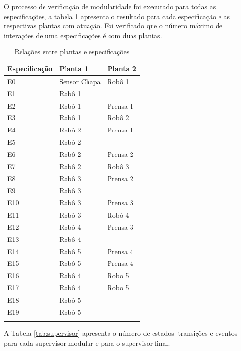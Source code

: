 O processo de verificação de modularidade foi executado para todas as especificações, a tabela \ref{tab:modulos} apresenta o resultado para cada especificação e as respectivas plantas com atuação.
Foi verificado que o número máximo de interações de uma especificações é com duas plantas.

\begin{table}[h]
\begin{center}
\begin{minipage}{0.5\textwidth}
\caption{Relações entre plantas e especificações}
\label{tab:modulos}
\begin{tabular}{@{}lll@{}}
  \toprule
  Especificação &  Planta 1 & Planta 2\\
  \midrule
  E0 & Sensor Chapa & Robô 1\\
  E1 & Robô 1 & \\
  E2 & Robô 1 & Prensa 1\\
  E3 & Robô 1 & Robô 2\\
  E4 & Robô 2 & Prensa 1\\
  E5 & Robô 2 & \\
  E6 & Robô 2 & Prensa 2\\
  E7 & Robô 2 & Robô 3\\
  E8 & Robô 3 & Prensa 2\\
  E9 & Robô 3 & \\
  E10 & Robô 3 & Prensa 3\\
  E11 & Robô 3 & Robô 4\\
  E12 & Robô 4 & Prensa 3\\
  E13 & Robô 4 & \\
  E14 & Robô 5 & Prensa 4\\
  E15 & Robô 5 & Prensa 4\\
  E16 & Robô 4 & Robo 5\\
  E17 & Robô 4 & Robo 5\\
  E18 & Robô 5 & \\
  E19 & Robô 5 & \\
  \botrule
\end{tabular}
\end{minipage}
\end{center}
\end{table}

A Tabela \ref{tab:supervisor} apresenta o número de estados, transições e eventos para cada supervisor modular e para o supervisor final.

